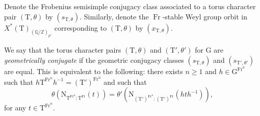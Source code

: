 \documentclass[12pt, reqno]{amsart}
\theoremstyle{definition}
\theoremstyle{definition}
\theoremstyle{definition}
\newcommand{\aFieldNorm}{\mathrm{N}}
\newcommand{\Frobenius}{\operatorname{Fr}}
\newcommand{\algebraicGroup}[1]{\boldsymbol{\mathrm{#1}}}
\newcommand{\CharacterLattice}[1]{X^{\ast}\left(#1\right)}
\begin{document}
Denote the Frobenius semisimple conjugacy class associated to a torus character pair $(\algebraicGroup{T},\theta)$ by $(s_{\algebraicGroup{T},\theta})$. Similarly, denote the $\Frobenius$-stable Weyl group orbit in $\CharacterLattice{\algebraicGroup{T}}_{(\mathbb{Q}/\mathbb{Z})_{p'}}$ corresponding to $(\algebraicGroup{T},\theta)$ by $(x_{\algebraicGroup{T},\theta}).$

We say that the torus character pairs $(\algebraicGroup{T},\theta)$ and $(\algebraicGroup{T}',\theta')$ for $\algebraicGroup{G}$ are \emph{geometrically conjugate} if the geometric conjugacy classes $(s_{\algebraicGroup{T},\theta})$ and $(s_{\algebraicGroup{T}',\theta'})$ are equal. This is equivalent to the following: there exists $n \ge 1$ and $h \in {\algebraicGroup{G}}^{\Frobenius^n}$ such that $h \algebraicGroup{T}^{\Frobenius^n} h^{-1} = \left(\algebraicGroup{T}'\right)^{\Frobenius^n}$ and such that $$\theta\left(\aFieldNorm_{\algebraicGroup{T}^{\Frobenius^n}:\algebraicGroup{T}^{\Frobenius}}\left(t\right)\right) = \theta'\left(\aFieldNorm_{\left(\algebraicGroup{T}'\right)^{\Frobenius^n}:\left(\algebraicGroup{T}'\right)^{\Frobenius}}\left(h t h^{-1}\right)\right),$$ for any $t \in \algebraicGroup{T}^{\Frobenius^n}$.
\end{document}

